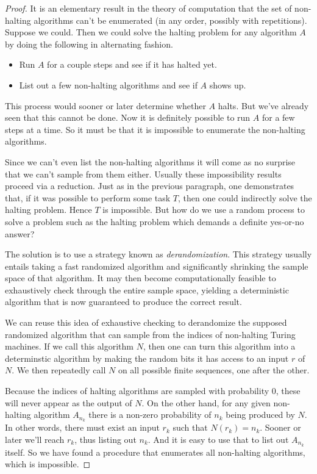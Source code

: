 \begin{proof}
It is an elementary result in the theory of computation that the set of non-halting algorithms can't be enumerated (in any order, possibly with repetitions). Suppose we could. Then we could solve the halting problem for any algorithm $A$ by doing the following in alternating fashion.
\begin{itemize}
	\item Run $A$ for a couple steps and see if it has halted yet. 
	\item List out a few non-halting algorithms and see if $A$ shows up.
\end{itemize}
This process would sooner or later determine whether $A$ halts. But we've already seen that this cannot be done. Now it is definitely possible to run $A$ for a few steps at a time. So it must be that it is impossible to enumerate the non-halting algorithms.

Since we can't even list the non-halting algorithms it will come as no surprise that we can't sample from them either. Usually these impossibility results proceed via a reduction. Just as in the previous paragraph, one demonstrates that, if it was possible to perform some task $T$, then one could indirectly solve the halting problem. Hence $T$ is impossible. But how do we use a random process to solve a problem such as the halting problem which demands a definite yes-or-no answer?

The solution is to use a strategy known as \textit{derandomization}. This strategy usually entails taking a fast randomized algorithm and significantly shrinking the sample space of that algorithm. It may then become computationally feasible to exhaustively check through the entire sample space, yielding a deterministic algorithm that is now guaranteed to produce the correct result.

We can reuse this idea of exhaustive checking to derandomize the supposed randomized algorithm that can sample from the indices of non-halting Turing machines. If we call this algorithm $N$, then one can turn this algorithm into a determinstic algorithm by making the random bits it has access to an input $r$ of $N$. We then repeatedly call $N$ on all possible finite sequences, one after the other.

Because the indices of halting algorithms are sampled with probability 0, these will never appear as the output of $N$. On the other hand, for any given non-halting algorithm $A_{n_k}$ there is a non-zero probability of $n_k$ being produced by $N$. In other words, there must exist an input $r_k$ such that $N(r_k) = n_k$. Sooner or later we'll reach $r_k$, thus listing out $n_k$. And it is easy to use that to list out $A_{n_k}$ itself. So we have found a procedure that enumerates all non-halting algorithms, which is impossible. \lightning
\end{proof}

